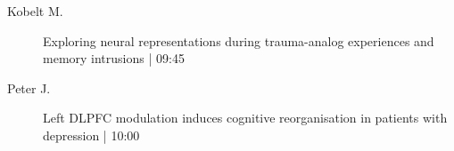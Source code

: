\begin{symposium}
\begin{description}
                \item [ Kobelt M.] Exploring neural representations during trauma-analog experiences and memory intrusions \textcolor{mygray}{ | 09:45}    
                
                \item [ Peter J.] Left DLPFC modulation induces cognitive reorganisation in patients with depression \textcolor{mygray}{ | 10:00}    
                
            \end{description} 
            \end{symposium}
            